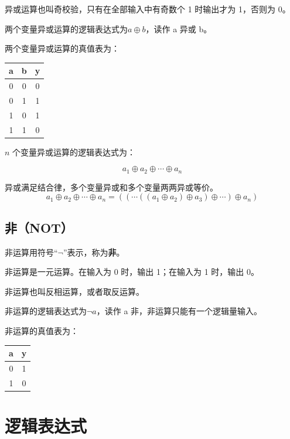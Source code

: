 \begin{remark}{}{}
  异或运算也叫奇校验，只有在全部输入中有奇数个 1 时输出才为 1，否则为 0。
\end{remark}

两个变量异或运算的逻辑表达式为$a \oplus b$，读作 a 异或 b。

两个变量异或运算的真值表为：

\begin{longtable}{|c|c|c|}
\hline
\textbf{a} & \textbf{b} & \textbf{y} \\ \hline
\endhead
0 & 0 & 0 \\ \hline
0 & 1 & 1 \\ \hline
1 & 0 & 1 \\ \hline
1 & 1 & 0 \\ \hline
\end{longtable}

$n$ 个变量异或运算的逻辑表达式为：

$$a_1 \oplus a_2 \oplus \cdots \oplus a_n$$

\begin{remark}{}{}
  异或满足结合律，多个变量异或和多个变量两两异或等价。
  $$a_1 \oplus a_2 \oplus \cdots \oplus a_n = (( \cdots ((a_1 \oplus a_2) \oplus a_3) \oplus \cdots) \oplus a_n)$$
\end{remark}

\subsection{非（NOT）}

非运算用符号“$\lnot$”表示，称为\textbf{非}。

非运算是一元运算。在输入为 0 时，输出 1；在输入为 1 时，输出 0。

\begin{remark}{}{}
  非运算也叫反相运算，或者取反运算。
\end{remark}

非运算的逻辑表达式为$\lnot a$，读作 a 非，非运算只能有一个逻辑量输入。

非运算的真值表为：

\begin{longtable}{|c|c|}
\hline
\textbf{a} & \textbf{y} \\ \hline
\endhead
0 & 1 \\ \hline
1 & 0 \\ \hline
\end{longtable}

\section{逻辑表达式}

